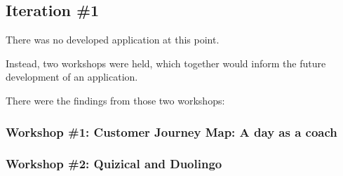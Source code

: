 \subsection{Iteration \#1}

  There was no developed application at this point.

  Instead, two workshops were held, which together would inform the future development of an application.

  There were the findings from those two workshops:

  \subsubsection{Workshop \#1: Customer Journey Map: A day as a coach}

  \subsubsection{Workshop \#2: Quizical and Duolingo}

